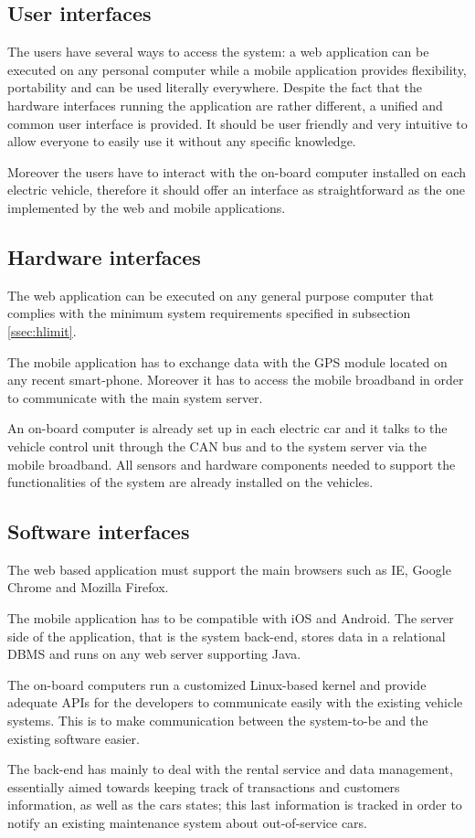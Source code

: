 \subsection{User interfaces}
The users have several ways to access the system: a web application can be executed on any personal computer while a mobile application provides flexibility, portability and can be used literally everywhere. Despite the fact that the hardware interfaces running the application are rather different, a unified and common user interface is provided. It should be user friendly and very intuitive to allow everyone to easily use it without any specific knowledge.

Moreover the users have to interact with the on-board computer installed on each electric vehicle, therefore it should offer an interface as straightforward as the one implemented by the web and mobile applications.

\subsection{Hardware interfaces} \label{hw_int}
The web application can be executed on any general purpose computer that complies with the minimum system requirements specified in subsection \ref{ssec:hlimit}.

The mobile application has to exchange data with the GPS module located on any recent smart-phone. Moreover it has to access the mobile broadband in order to communicate with the main system server.

An on-board computer is already set up in each electric car and it talks to the vehicle control unit through the CAN bus and to the system server via the mobile broadband. All sensors and hardware components needed to support the functionalities of the system are already installed on the vehicles.

\subsection{Software interfaces}
The web based application must support the main browsers such as IE, Google Chrome and Mozilla Firefox.

The mobile application has to be compatible with iOS and Android. The server side of the application, that is the system back-end, stores data in a relational DBMS and runs on any web server supporting Java.

The on-board computers run a customized Linux-based kernel and provide adequate APIs for the developers to communicate easily with the existing vehicle systems. This is to make communication between the system-to-be and the existing software easier.

The back-end has mainly to deal with the rental service and data management, essentially aimed towards keeping track of transactions and customers information, as well as the cars states; this last information is tracked in order to notify an existing maintenance system about out-of-service cars.